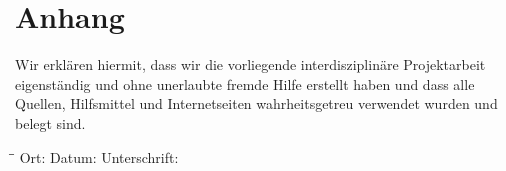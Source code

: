\documentclass{fancydocument}
\begin{document}
\section{Anhang}

Wir erklären hiermit, dass wir die vorliegende interdisziplinäre Projektarbeit eigenständig und ohne unerlaubte fremde Hilfe erstellt haben und dass alle Quellen, Hilfsmittel und Internetseiten wahrheitsgetreu verwendet wurden und belegt sind.

\begin{tabbing}
\hspace*{5cm}\=\hspace*{5cm}\=\kill
Ort: \>Datum: \>Unterschrift:\\
\end{tabbing}
\end{document}
